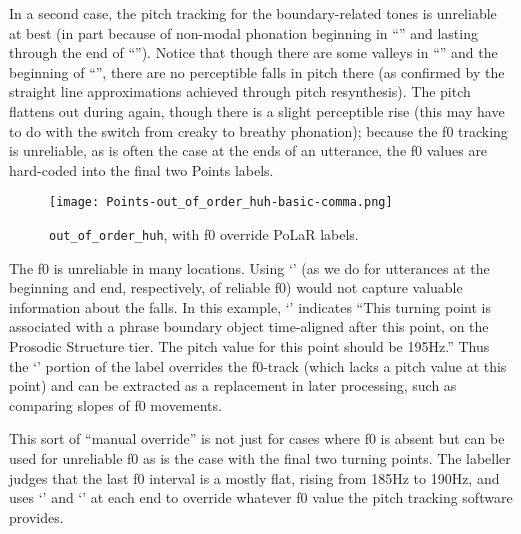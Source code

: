 In a second case, the pitch tracking for the boundary-related tones is unreliable at best (in part because of non-modal phonation beginning in “” and lasting through the end of “”). Notice that though there are some valleys in “” and the beginning of “”, there are no perceptible falls in pitch there (as confirmed by the straight line approximations achieved through pitch resynthesis). The pitch flattens out during again, though there is a slight perceptible rise (this may have to do with the switch from creaky to breathy phonation); because the f0 tracking is unreliable, as is often the case at the ends of an utterance, the f0 values are hard-coded into the final two Points labels.

\begin{figure}[H]
\centering
%
\texttt{[image: Points-out\_of\_order\_huh-basic-comma.png]}
%
\caption{\texttt{out\_of\_order\_huh}, with f0 override PoLaR labels.%
\label{fig:out_of_order_huh Points comma}%
%
}
\end{figure}

The f0 is unreliable in many locations. Using ‘’ (as we do for utterances at the beginning and end, respectively, of reliable f0) would not capture valuable information about the falls. 
In this example, ‘’ indicates “This turning point is associated with a phrase boundary object time-aligned after this point, on the Prosodic Structure tier. The pitch value for this point should be 195Hz.” Thus the ‘’ portion of the label overrides the f0-track (which lacks a pitch value at this point) and can be extracted as a replacement in later processing, such as comparing slopes of f0 movements.

This sort of “manual override” is not just for cases where f0 is absent but can be used for unreliable f0 as is the case with the final two turning points. The labeller judges that the last f0 interval is a mostly flat, rising from 185Hz to 190Hz, and uses ‘’ and ‘’ at each end to override whatever f0 value the pitch tracking software provides.

